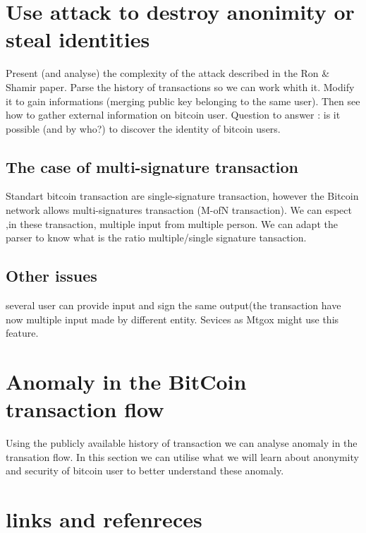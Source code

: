 \documentclass{acm_proc_article-sp}
\begin{document}
\section{Use attack to destroy anonimity or steal identities}
Present (and analyse) the complexity of the attack described in
the Ron \& Shamir paper. Parse the history of transactions so we can work whith it. Modify it to gain informations (merging public key belonging to the same user). Then see how to gather external information on bitcoin user. Question to answer : is it possible (and by who?) to discover the identity of bitcoin users.
\subsection{The case of multi-signature transaction}
Standart bitcoin transaction are single-signature transaction, however the Bitcoin network allows multi-signatures transaction (M-ofN transaction). We can espect ,in these transaction, multiple input from multiple person. We can adapt the parser to know what is the ratio multiple/single signature tansaction.
\subsection{Other issues}
several user can provide input and sign the same output(the transaction have now multiple input made by different entity.
Sevices as Mtgox might use this feature.
\section{Anomaly in the BitCoin transaction flow}
 Using the publicly available history of transaction we can analyse anomaly in the transation flow. In this section we can utilise what we will learn about anonymity and security of bitcoin user to better understand these anomaly. 
\section{links and refenreces}

\balancecolumns
\end{document}
